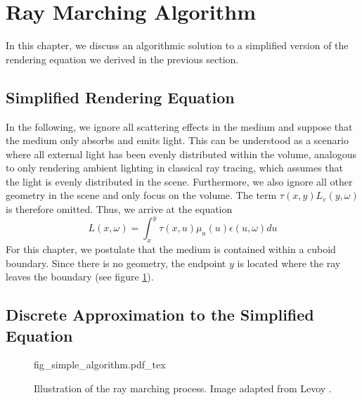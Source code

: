 \section{Ray Marching Algorithm}
\label{sec:ray_marching}
In this chapter, we discuss an algorithmic solution\cite{511, 10.1145/147130.147155} to a simplified version of the rendering equation we derived in the previous section.
\subsection{Simplified Rendering Equation}
In the following, we ignore all scattering effects in the medium and suppose that the medium only absorbs and emits light\cite{10.1145/147130.147155}. This can be understood as a scenario where all external light has been evenly distributed within the volume, analogous to only rendering ambient lighting in classical ray tracing, which assumes that the light is evenly distributed in the scene.
Furthermore, we also ignore all other geometry in the scene and only focus on the volume. The term $\tau({x}, {y}) L_e({y}, \omega )$ is therefore omitted.
Thus, we arrive at the equation
\begin{equation} \label{eq:simplified_req}
L({x}, \omega ) = \int_{{x}}^{{y}} \tau({x}, {u}){\mu}_a({u})\epsilon ({u}, \omega)d{u}
\end{equation}
For this chapter, we postulate that the medium is contained within a cuboid boundary\cite{10.1145/147130.147155, 10.1145/78964.78965}. Since there is no geometry, the endpoint $y$ is located where the ray leaves the boundary (see figure \ref{fig:simple_algorithm}).

\subsection{Discrete Approximation to the Simplified Equation}
\label{subsec:discrete_marching}
\begin{figure}
\centering
\def\svgwidth{\columnwidth}
{fig_simple_algorithm.pdf_tex}

\caption{Illustration of the ray marching process. Image adapted from Levoy \cite{10.1145/78964.78965}.}
\label{fig:simple_algorithm}
\end{figure}



